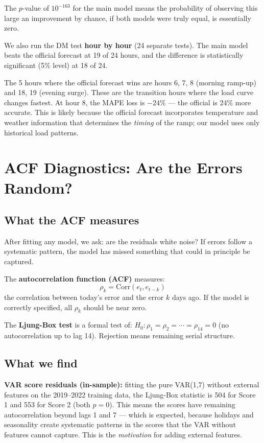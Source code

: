 \documentclass[11pt,a4paper]{article}
\begin{document}
The $p$-value of $10^{-163}$ for the main model means the probability
of observing this large an improvement by chance, if both models were
truly equal, is essentially zero.

We also run the DM test \textbf{hour by hour} (24 separate tests).
The main model beats the official forecast at 19 of 24 hours, and
the difference is statistically significant (5\% level) at 18 of 24.

The 5 hours where the official forecast wins are hours 6, 7, 8
(morning ramp-up) and 18, 19 (evening surge). These are the
transition hours where the load curve changes fastest. At hour 8,
the MAPE loss is $-24\%$ --- the official is 24\% more accurate.
This is likely because the official forecast incorporates temperature
and weather information that determines the \emph{timing} of the
ramp; our model uses only historical load patterns.

\section{ACF Diagnostics: Are the Errors Random?}

\subsection{What the ACF measures}

After fitting any model, we ask: are the residuals white noise?
If errors follow a systematic pattern, the model has missed something
that could in principle be captured.

The \textbf{autocorrelation function (ACF)} measures:
\[
\rho_k = \text{Corr}(e_t, e_{t-k})
\]
the correlation between today's error and the error $k$ days ago.
If the model is correctly specified, all $\rho_k$ should be near zero.

The \textbf{Ljung-Box test} is a formal test of:
$H_0: \rho_1 = \rho_2 = \cdots = \rho_{14} = 0$ (no autocorrelation
up to lag 14). Rejection means remaining serial structure.

\subsection{What we find}

\textbf{VAR score residuals (in-sample):} fitting the pure VAR(1,7)
without external features on the 2019--2022 training data, the
Ljung-Box statistic is 504 for Score 1 and 553 for Score 2 (both
$p = 0$). This means the scores have remaining autocorrelation
beyond lags 1 and 7 --- which is expected, because holidays and
seasonality create systematic patterns in the scores that the VAR
without features cannot capture. This is the \emph{motivation} for
adding external features.
\end{document}
